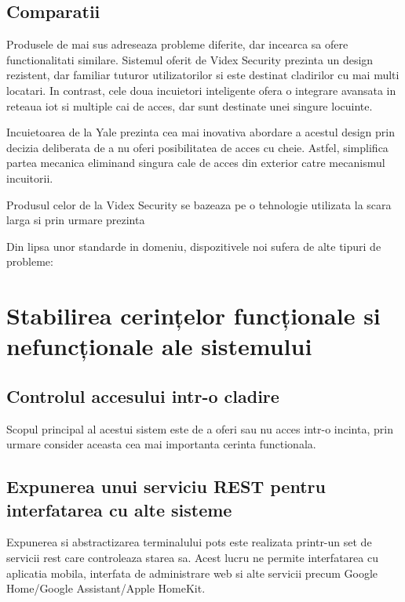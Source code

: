 \subsection {Comparatii}

Produsele de mai sus adreseaza probleme diferite, dar incearca sa ofere functionalitati similare. Sistemul oferit de Videx Security prezinta un design rezistent, dar familiar tuturor utilizatorilor si este destinat cladirilor cu mai multi locatari. In contrast, cele doua incuietori inteligente ofera o integrare avansata in reteaua \acrshort{iot} si multiple cai de acces, dar sunt destinate unei singure locuinte.

Incuietoarea de la Yale prezinta cea mai inovativa abordare a acestul design prin decizia deliberata de a nu oferi posibilitatea de acces cu cheie. Astfel, simplifica partea mecanica eliminand singura cale de acces din exterior catre mecanismul incuitorii.

Produsul celor de la Videx Security se bazeaza pe o tehnologie utilizata la scara larga si prin urmare prezinta 

Din lipsa unor standarde in domeniu, dispozitivele noi sufera de alte tipuri de probleme:
\cite{Bitdefender2016IoT}

\section {Stabilirea cerințelor funcționale si nefuncționale ale sistemului}

\subsection{Controlul accesului intr-o cladire}

Scopul principal al acestui sistem este de a oferi sau nu acces intr-o incinta, prin urmare consider aceasta cea mai importanta cerinta functionala.

\subsection{Expunerea unui serviciu REST pentru interfatarea cu alte sisteme}

Expunerea si abstractizarea terminalului \acrshort{pots} este realizata printr-un set de servicii \acrfull{rest} care controleaza starea sa. Acest lucru ne permite interfatarea cu aplicatia mobila, interfata de administrare web si alte servicii precum Google Home/Google Assistant/Apple HomeKit.

